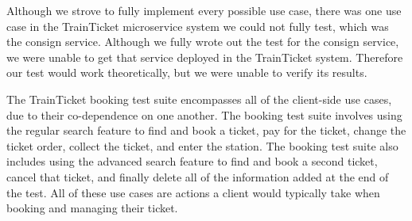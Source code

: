  Although we strove to fully implement every possible use case, there was one use case in the TrainTicket microservice system we could not fully test, which was the consign service. Although we fully wrote out the test for the consign service, we were unable to get that service deployed in the TrainTicket system. Therefore our test would work theoretically, but we were unable to verify its results.

The TrainTicket booking test suite encompasses all of the client-side use cases, due to their co-dependence on one another. The booking test suite involves using the regular search feature to find and book a ticket, pay for the ticket, change the ticket order, collect the ticket, and enter the station. The booking test suite also includes using the advanced search feature to find and book a second ticket, cancel that ticket, and finally delete all of the information added at the end of the test. All of these use cases are actions a client would typically take when booking and managing their ticket.

